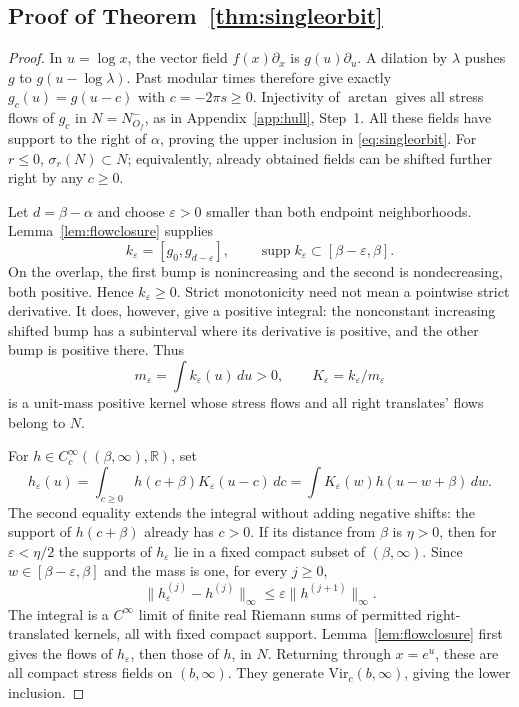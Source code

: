 \documentclass[12pt]{article}
\theoremstyle{definition}
\theoremstyle{remark}
\begin{document}
\subsection{Proof of Theorem~\ref{thm:singleorbit}}
\begin{proof}
In \(u=\log x\), the vector field \(f(x)\partial_x\) is \(g(u)\partial_u\).
A dilation by \(\lambda\) pushes \(g\) to \(g(u-\log\lambda)\).
Past modular times therefore give exactly \(g_c(u)=g(u-c)\) with
\(c=-2\pi s\ge0\). Injectivity of \(\arctan\) gives all stress flows of
\(g_c\) in \(N=N^-_{O_f}\), as in Appendix~\ref{app:hull}, Step~1.
All these fields have support to the right of \(\alpha\), proving the upper
inclusion in \eqref{eq:singleorbit}. For \(r\le0\),
\(\sigma_r(N)\subset N\); equivalently, already obtained fields can be shifted
further right by any \(c\ge0\).

Let \(d=\beta-\alpha\) and choose \(\varepsilon>0\) smaller than both endpoint
neighborhoods. Lemma~\ref{lem:flowclosure} supplies
\[
 k_\varepsilon=[g_0,g_{d-\varepsilon}],\qquad
 \operatorname{supp}k_\varepsilon\subset[\beta-\varepsilon,\beta].
\]
On the overlap, the first bump is nonincreasing and the second is
nondecreasing, both positive. Hence \(k_\varepsilon\ge0\).
Strict monotonicity need not mean a pointwise strict derivative. It does,
however, give a positive integral: the nonconstant increasing shifted bump
has a subinterval where its derivative is positive, and the other bump is
positive there. Thus
\[
 m_\varepsilon=\int k_\varepsilon(u)\,du>0,\qquad
 K_\varepsilon=k_\varepsilon/m_\varepsilon
\]
is a unit-mass positive kernel whose stress flows and all right translates'
flows belong to \(N\).

For \(h\in C_c^\infty((\beta,\infty),\mathbb R)\), set
\begin{equation}\label{eq:positivekernel}
 h_\varepsilon(u)=\int_{c\ge0}h(c+\beta)K_\varepsilon(u-c)\,dc
                =\int K_\varepsilon(w)h(u-w+\beta)\,dw .
\end{equation}
The second equality extends the integral without adding negative shifts:
the support of \(h(c+\beta)\) already has \(c>0\).
If its distance from \(\beta\) is \(\eta>0\), then for
\(\varepsilon<\eta/2\) the supports of \(h_\varepsilon\) lie in a fixed
compact subset of \((\beta,\infty)\). Since
\(w\in[\beta-\varepsilon,\beta]\) and the mass is one, for every \(j\ge0\),
\[
 \|h_\varepsilon^{(j)}-h^{(j)}\|_\infty
 \le\varepsilon\|h^{(j+1)}\|_\infty .
\]
The integral is a \(C^\infty\) limit of finite real Riemann sums of permitted
right-translated kernels, all with fixed compact support. Lemma~\ref{lem:flowclosure}
first gives the flows of \(h_\varepsilon\), then those of \(h\), in \(N\).
Returning through \(x=e^u\), these are all compact stress fields on
\((b,\infty)\). They generate \(\mathrm{Vir}_c(b,\infty)\), giving the lower
inclusion.


\end{proof}
\end{document}
